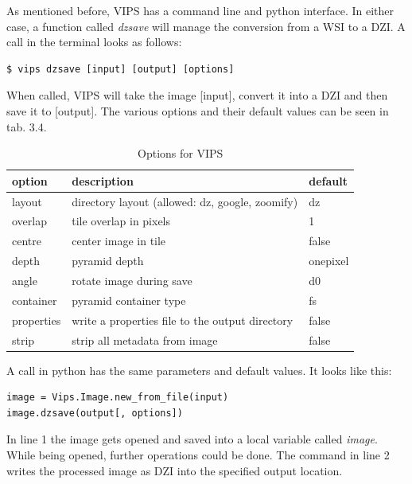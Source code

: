 As mentioned before, VIPS has a command line and python interface. In either case, a function called \emph{dzsave} will manage the conversion from a WSI to a DZI. A call in the terminal looks as follows:

\begin{lstlisting}
$ vips dzsave [input] [output] [options]
\end{lstlisting}

When called, VIPS will take the image [input], convert it into a DZI and then save it to [output]. The various options and their default values can be seen in tab. 3.4. 

\begin{table}[H]
	\begin{center}
		\begin{tabular}{| l | l | l |}
			\hline
			\textbf{option} & \textbf{description} & \textbf{default} \\ \hline
			layout & directory layout (allowed: dz, google, zoomify) & dz \\ \hline
			overlap & tile overlap in pixels & 1 \\ \hline
			centre & center image in tile & false \\ \hline
			depth & pyramid depth & onepixel \\ \hline
			angle & rotate image during save & d0 \\ \hline
			container & pyramid container type & fs \\ \hline
			properties & write a properties file to the output directory & false \\ \hline
			strip & strip all metadata from image & false \\ \hline
		\end{tabular}
		\caption{Options for VIPS}
	\end{center}
\end{table}

A call in python has the same parameters and default values. It looks like this:

\begin{lstlisting}[frame=single]
image = Vips.Image.new_from_file(input)
image.dzsave(output[, options])
\end{lstlisting}

In line 1 the image gets opened and saved into a local variable called \emph{image}. While being opened, further operations could be done. The command in line 2 writes the processed image as DZI into the specified output location.


